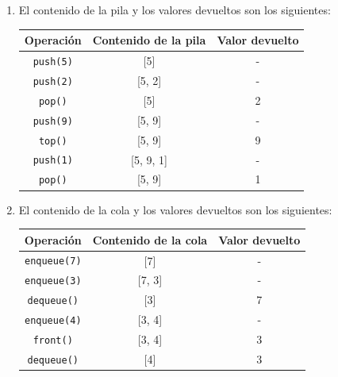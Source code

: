 \documentclass[12pt]{article}
\begin{document}
\begin{enumerate}
            \item El contenido de la pila y los valores devueltos son los siguientes:

            \begin{center}
            \begin{tabular}{|c|c|c|}
            \hline
            Operación & Contenido de la pila & Valor devuelto \\ \hline
            \texttt{push(5)} & [5] & - \\ \hline
            \texttt{push(2)} & [5, 2] & - \\ \hline
            \texttt{pop()} & [5] & 2 \\ \hline
            \texttt{push(9)} & [5, 9] & - \\ \hline
            \texttt{top()} & [5, 9] & 9 \\ \hline
            \texttt{push(1)} & [5, 9, 1] & - \\ \hline
            \texttt{pop()} & [5, 9] & 1 \\ \hline
            \end{tabular}
            \end{center}

            \item El contenido de la cola y los valores devueltos son los siguientes:

            \begin{center}
            \begin{tabular}{|c|c|c|}
            \hline
            Operación & Contenido de la cola & Valor devuelto \\ \hline
            \texttt{enqueue(7)} & [7] & - \\ \hline
            \texttt{enqueue(3)} & [7, 3] & - \\ \hline
            \texttt{dequeue()} & [3] & 7 \\ \hline
            \texttt{enqueue(4)} & [3, 4] & - \\ \hline
            \texttt{front()} & [3, 4] & 3 \\ \hline
            \texttt{dequeue()} & [4] & 3 \\ \hline
            \end{tabular}
            \end{center}
        \end{enumerate}
\end{document}
